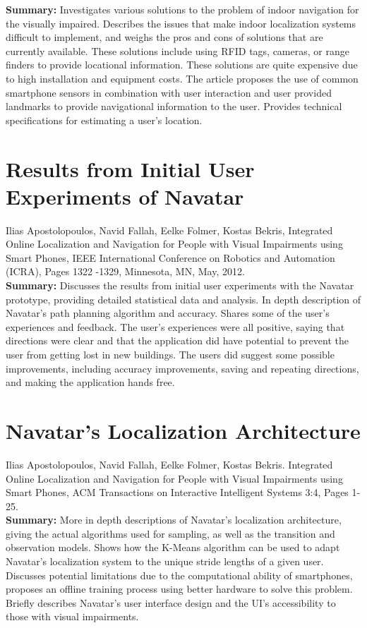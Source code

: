 \documentclass{scrreprt}
\begin{document}
 \textbf{Summary:}
Investigates various solutions to the problem of indoor navigation for the visually impaired. Describes the issues that make indoor localization systems difficult to implement, and weighs the pros and cons of solutions that are currently available. These solutions include using RFID tags, cameras, or range finders to provide locational information. These solutions are quite expensive due to high installation and equipment costs. The article proposes the use of common smartphone sensors in combination with user interaction and user provided landmarks to provide navigational information to the user. Provides technical specifications for estimating a user’s location.
 
\section{Results from Initial User Experiments of Navatar}
Ilias Apostolopoulos, Navid Fallah, Eelke Folmer, Kostas Bekris, Integrated Online Localization and Navigation for People with Visual Impairments using Smart Phones, IEEE International Conference on Robotics and Automation (ICRA), Pages 1322 -1329, Minnesota, MN, May, 2012.\\

\textbf{Summary:}
Discusses the results from initial user experiments with the Navatar prototype, providing detailed statistical data and analysis. In depth description of Navatar’s path planning algorithm and accuracy. Shares some of the user’s experiences and feedback. The user’s experiences were all positive, saying that directions were clear and that the application did have potential to prevent the user from getting lost in new buildings. The users did suggest some possible improvements, including accuracy improvements, saving and repeating directions, and making the application hands free.
\pagebreak
\section{Navatar’s Localization Architecture}
 Ilias Apostolopoulos, Navid Fallah, Eelke Folmer, Kostas Bekris. Integrated Online Localization and Navigation for People with Visual Impairments using Smart Phones, ACM Transactions on Interactive Intelligent Systems 3:4, Pages 1-25.\\

\textbf{Summary:}
More in depth descriptions of Navatar’s localization architecture, giving the actual algorithms used for sampling, as well as the transition and observation models. Shows how the K-Means algorithm can be used to adapt Navatar’s localization system to the unique stride lengths of a given user. Discusses potential limitations due to the computational ability of smartphones, proposes an offline training process using better hardware to solve this problem. Briefly describes Navatar’s user interface design and the UI’s accessibility to those with visual impairments.
\end{document}
